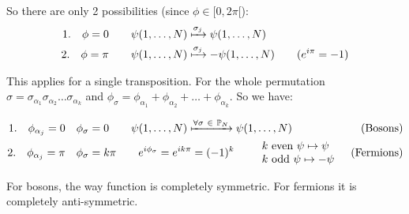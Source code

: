 So there are only 2 possibilities (since $\phi \in [0,2\pi[$): 
\begin{align*}
    1. \quad \phi = 0 \qquad &\psi(1,\dots,N) \xmapsto{\sigma_j} \psi(1,\dots,N) \\
    2. \quad \phi = \pi \qquad &\psi(1,\dots,N) \xmapsto{\sigma_j} -\psi(1,\dots,N) \qquad \small{(e^{i\pi} = -1)}
\end{align*}

This applies for a single transposition. For the whole permutation $\sigma = \sigma_{\alpha_1}\sigma_{\alpha_2}\dots\sigma_{\alpha_k}$ and $\phi_\sigma = \phi_{\alpha_1} + \phi_{\alpha_2} + \dots + \phi_{\alpha_k}$. So we have:

\begin{align*}
    1. \quad \phi_{\alpha_j} = 0\quad &\phi_\sigma = 0 \qquad \psi(1,\dots, N) \xmapsto{\forall\sigma \ \in \ \mathbb{P}_N} \psi(1,\dots,N) &\text{(Bosons)}\\
    2. \quad \phi_{\alpha_j} = \pi \quad &\phi_\sigma = k\pi \qquad e^{i\phi_\sigma} = e^{ik\pi} = (-1)^k \qquad \begin{array}{l} \text{$k$ even } \psi \mapsto\psi \\ \text{$k$ odd } \psi \mapsto -\psi \end{array} &\text{(Fermions)}
\end{align*}

For bosons, the way function is completely symmetric. For fermions it is completely anti-symmetric. 



